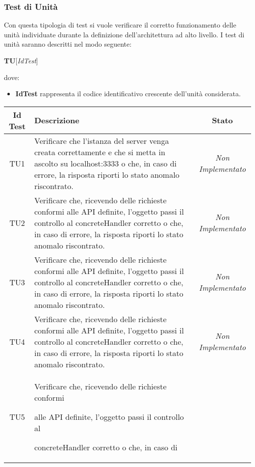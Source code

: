 \subsubsection{Test di Unità}
Con questa tipologia di test si vuole verificare il corretto funzionamento delle unità individuate durante la definizione dell'architettura ad alto livello.
I test di unità saranno descritti nel modo seguente:
\begin{center}
\textbf{TU}[\textit{IdTest}]
\end{center}
dove:
\begin{itemize}
\item \textbf{IdTest} rappresenta il codice identificativo crescente dell'unità considerata.
\end{itemize}

\normalsize
\begin{longtable}{|c|>{}m{10cm}|c|}
\hline 
\textbf{Id Test} & \textbf{Descrizione} & \textbf{Stato}\\
\hline
\endhead
\hypertarget{TU1}{TU1} & Verificare che l’istanza del server venga creata correttamente e che si metta in ascolto su localhost:3333 o che, in caso di errore, la risposta riporti lo stato anomalo riscontrato. & \textit{Non Implementato}\\ \hline
\hypertarget{TU2}{TU2} & Verificare che, ricevendo delle richieste conformi alle API definite, l’oggetto passi il controllo al
concreteHandler corretto o che, in caso di errore, la risposta riporti lo stato anomalo riscontrato. & \textit{Non Implementato}\\ \hline
\hypertarget{TU3}{TU3} & Verificare che, ricevendo delle richieste conformi
alle API definite, l’oggetto passi il controllo al
concreteHandler corretto o che, in caso di
errore, la risposta riporti lo stato anomalo riscontrato. & \textit{Non Implementato}\\ \hline
\hypertarget{TU4}{TU4} & Verificare che, ricevendo delle richieste conformi
alle API definite, l’oggetto passi il controllo al
concreteHandler corretto o che, in caso di
errore, la risposta riporti lo stato anomalo riscontrato. & \textit{Non Implementato}\\ \hline
\hypertarget{TU5}{TU5} & Verificare che, ricevendo delle richieste conformi

alle API definite, l’oggetto passi il controllo al

concreteHandler corretto o che, in caso di


\end{longtable}
